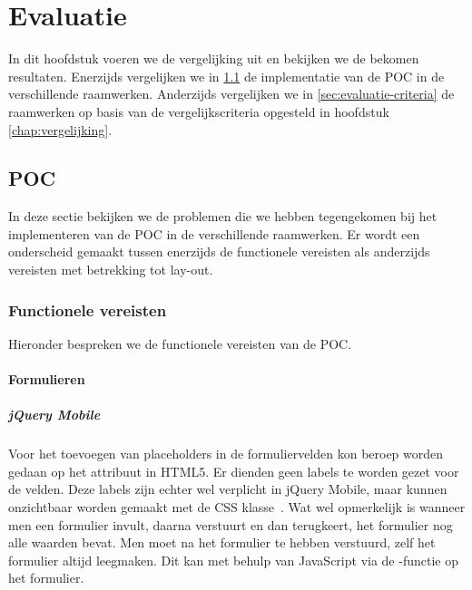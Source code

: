 \chapter{Evaluatie}
\label{chap:evaluatie}

In dit hoofdstuk voeren we de vergelijking uit en bekijken we de bekomen resultaten.
Enerzijds vergelijken we in \ref{sec:evaluatie-poc} de implementatie van de POC in de verschillende raamwerken.
Anderzijds vergelijken we in \ref{sec:evaluatie-criteria} de raamwerken op basis van de vergelijkscriteria opgesteld in hoofdstuk \ref{chap:vergelijking}.


\section{POC}
\label{sec:evaluatie-poc}
In deze sectie bekijken we de problemen die we hebben tegengekomen bij het implementeren van de POC in de verschillende raamwerken.
Er wordt een onderscheid gemaakt tussen enerzijds de functionele vereisten als anderzijds vereisten met betrekking tot lay-out.

\subsection{Functionele vereisten}
Hieronder bespreken we de functionele vereisten van de POC.

\subsubsection{Formulieren}

\paragraph{jQuery Mobile} 
Voor het toevoegen van placeholders in de formuliervelden kon beroep worden gedaan op het  attribuut in HTML5. Er dienden geen labels te worden gezet voor de velden. Deze labels zijn echter wel verplicht in jQuery Mobile, maar kunnen onzichtbaar worden gemaakt met de  CSS klasse~\cite{JQuery2013}. Wat wel opmerkelijk is wanneer men een formulier invult, daarna verstuurt en dan terugkeert, het formulier nog alle waarden bevat. Men moet na het formulier te hebben verstuurd, zelf het formulier altijd leegmaken. Dit kan met behulp van JavaScript via de -functie op het formulier.

